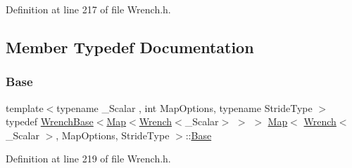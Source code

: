 Definition at line 217 of file Wrench.\+h.



\subsection{Member Typedef Documentation}
\hypertarget{class_map_3_01_wrench_3_01___scalar_01_4_00_01_map_options_00_01_stride_type_01_4_ae2acfdad9b8a19976e088f86e664d657}{}\label{class_map_3_01_wrench_3_01___scalar_01_4_00_01_map_options_00_01_stride_type_01_4_ae2acfdad9b8a19976e088f86e664d657} 
\subsubsection{\texorpdfstring{Base}{Base}}
{\footnotesize\ttfamily template$<$typename \+\_\+\+Scalar , int Map\+Options, typename Stride\+Type $>$ \\
typedef \hyperlink{class_wrench_base}{Wrench\+Base}$<$\hyperlink{class_map_3_01_wrench_3_01___scalar_01_4_00_01_map_options_00_01_stride_type_01_4_ab778c7158f5d29d76672346ecfe4e3ea}{Map}$<$\hyperlink{class_wrench}{Wrench}$<$\+\_\+\+Scalar$>$ $>$ $>$ \hyperlink{class_map_3_01_wrench_3_01___scalar_01_4_00_01_map_options_00_01_stride_type_01_4_ab778c7158f5d29d76672346ecfe4e3ea}{Map}$<$ \hyperlink{class_wrench}{Wrench}$<$ \+\_\+\+Scalar $>$, Map\+Options, Stride\+Type $>$\+::\hyperlink{class_map_3_01_wrench_3_01___scalar_01_4_00_01_map_options_00_01_stride_type_01_4_ae2acfdad9b8a19976e088f86e664d657}{Base}\hspace{0.3cm}{\ttfamily [protected]}}



Definition at line 219 of file Wrench.\+h.

\hypertarget{class_map_3_01_wrench_3_01___scalar_01_4_00_01_map_options_00_01_stride_type_01_4_abfc1bf3f7dc1d3051325edad634172e8}{}\label{class_map_3_01_wrench_3_01___scalar_01_4_00_01_map_options_00_01_stride_type_01_4_abfc1bf3f7dc1d3051325edad634172e8} 
